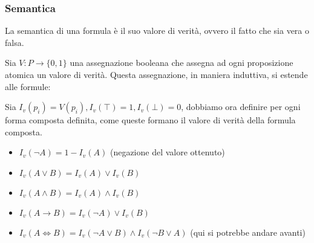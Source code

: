 \subsubsection{Semantica}
La semantica di una formula è il suo valore di verità, ovvero il fatto che sia vera o falsa. 

Sia $V: P \to \{0, 1\}$ una assegnazione booleana che assegna ad ogni proposizione atomica un valore di verità. Questa assegnazione, in maniera induttiva, si estende alle formule:

Sia $I_v(p_i) = V(p_i), I_v(\top) = 1, I_v(\bot) = 0$, dobbiamo ora definire per ogni forma composta definita, come queste formano il valore di verità della formula composta.
\begin{itemize}
    \item $I_v(\neg A) = 1 - I_v(A)$ (negazione del valore ottenuto)
    \item $I_v(A \lor B) = I_v(A) \lor I_v(B)$
    \item $I_v(A \land B) = I_v(A) \land I_v(B)$
    \item $I_v(A \to B) = I_v(\neg A) \lor I_v(B)$
    \item $I_v(A \Leftrightarrow B) = I_v(\neg A \lor B) \land I_v(\neg B \lor A)$ (qui si potrebbe andare avanti)
\end{itemize}
